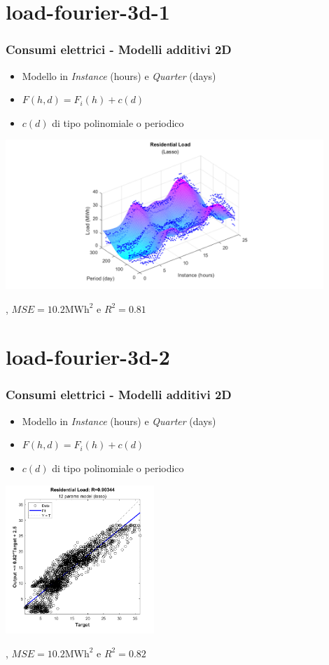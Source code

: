 \documentclass{beamer}
\begin{document}
\section{load-fourier-3d-1}
\begin{frame}
    \frametitle{Consumi elettrici - Modelli additivi 2D}   
    \begin{itemize}
        \item Modello in \textit{Instance} (hours) e \textit{Quarter} (days)
        \item $F(h, d)=F_i(h)+c(d)$
        \item $c(d)$ di tipo polinomiale o periodico
    \end{itemize}
    \vfill
    \centering
    \includegraphics[width=0.9\textwidth,keepaspectratio]{all_residential_load_lasso_const_f.png} 
    
    \scriptsize  {}, $MSE=10.2\text{MWh}^2$ e $R^2=0.81$
\end{frame}

\section{load-fourier-3d-2}
\begin{frame}
    \frametitle{Consumi elettrici - Modelli additivi 2D}   
    \begin{itemize}
        \item Modello in \textit{Instance} (hours) e \textit{Quarter} (days)
        \item $F(h, d)=F_i(h)+c(d)$
        \item $c(d)$ di tipo polinomiale o periodico
    \end{itemize}
    \vspace{0.3cm}
    \vfill
    \centering
    \includegraphics[width=0.42\textwidth,keepaspectratio]{all_residential_load_lasso_const_f_plotregression.png} 

    \scriptsize {}, $MSE= 10.2\text{MWh}^2$ e $R^2=0.82$
\end{frame}
\end{document}
